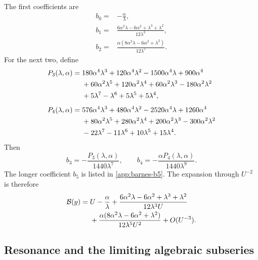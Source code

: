 \documentclass[11pt,oneside]{article}
\theoremstyle{plain}
\theoremstyle{definition}
\theoremstyle{remark}
\newcommand{\Bcal}{\mathcal{B}}
\begin{document}
The first coefficients are
\begin{align}
 b_0={}&-\frac{\alpha}{\lambda},
 \label{eq:barnes-b0}\\[0.4em]
 b_1={}&\frac{6\alpha^2\lambda-6\alpha^2+\lambda^3+\lambda^2}
 {12\lambda^3},
 \label{eq:barnes-b1}\\[0.4em]
 b_2={}&\frac{\alpha(8\alpha^2\lambda-6\alpha^2+\lambda^2)}
 {12\lambda^5}.
 \label{eq:barnes-b2}
\end{align}
For the next two, define
\begin{align}
 P_3(\lambda,\alpha)={}&
 180\alpha^4\lambda^3+120\alpha^4\lambda^2
 -1500\alpha^4\lambda+900\alpha^4
 \notag\\
 &+60\alpha^2\lambda^5+120\alpha^2\lambda^4
 +60\alpha^2\lambda^3-180\alpha^2\lambda^2
 \notag\\
 &+5\lambda^7-\lambda^6+5\lambda^5+5\lambda^4,
 \label{eq:barnes-P3}\\[0.4em]
 P_4(\lambda,\alpha)={}&
 576\alpha^4\lambda^3+480\alpha^4\lambda^2
 -2520\alpha^4\lambda+1260\alpha^4
 \notag\\
 &+80\alpha^2\lambda^5+280\alpha^2\lambda^4
 +200\alpha^2\lambda^3-300\alpha^2\lambda^2
 \notag\\
 &-22\lambda^7-11\lambda^6+10\lambda^5+15\lambda^4.
 \label{eq:barnes-P4}
\end{align}
Then
\begin{equation}
 b_3=-\frac{P_3(\lambda,\alpha)}{1440\lambda^7},
 \qquad
 b_4=-\frac{\alpha P_4(\lambda,\alpha)}{1440\lambda^9}.
 \label{eq:barnes-b3-b4}
\end{equation}
The longer coefficient \(b_5\) is listed in
\cref{app:barnes-b5}.  The expansion through \(U^{-2}\) is therefore
\begin{align}
 \Bcal(y)={}&U-\frac{\alpha}{\lambda}
 +\frac{6\alpha^2\lambda-6\alpha^2+\lambda^3+\lambda^2}
 {12\lambda^3U}
 \notag\\
 &+\frac{\alpha(8\alpha^2\lambda-6\alpha^2+\lambda^2)}
 {12\lambda^5U^2}
 +O(U^{-3}).
 \label{eq:barnes-three-blocks}
\end{align}

\subsection{Resonance and the limiting algebraic subseries}
\label{sec:barnes-resonance}
\end{document}
